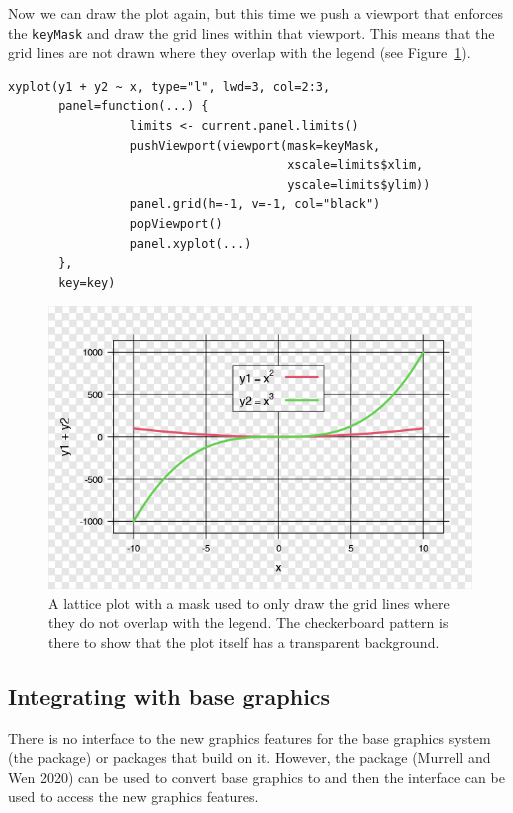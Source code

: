 Now we can draw the  plot again, but this time we push
a  viewport that enforces the \texttt{keyMask} and draw
the grid lines within that viewport. This means that
the grid lines are not drawn where they overlap with the legend
(see Figure~\ref{fig:legend}).

\begin{verbatim}
xyplot(y1 + y2 ~ x, type="l", lwd=3, col=2:3,
       panel=function(...) { 
                 limits <- current.panel.limits()
                 pushViewport(viewport(mask=keyMask, 
                                       xscale=limits$xlim, 
                                       yscale=limits$ylim))
                 panel.grid(h=-1, v=-1, col="black")
                 popViewport()
                 panel.xyplot(...)
       },
       key=key)
\end{verbatim}

\begin{figure}[h]
\includegraphics[width=1\linewidth]{murrell-definitions-2023_files/figure-latex/legend-1} \caption{A lattice plot with a mask used to only draw the grid lines where they do not overlap with the legend. The checkerboard pattern is there to show that the plot itself has a transparent background.}\label{fig:legend}
\end{figure}

\hypertarget{integrating-with-base-graphics}{%
\subsection{Integrating with base graphics}\label{integrating-with-base-graphics}}

There is no interface to the new graphics features for
the base graphics system (the  package) or packages
that build on it. However, the
 package (Murrell and Wen 2020)
can be used to convert base graphics to 
and then the  interface can be used to access the
new graphics features.

